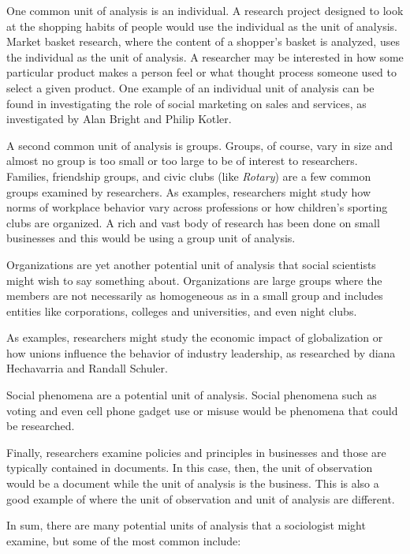 One common unit of analysis is an individual. A research project designed to look at the shopping habits of people would use the individual as the unit of analysis. Market basket research, where the content of a shopper's basket is analyzed, uses the individual as the unit of analysis. A researcher may be interested in how some particular product makes a person feel or what thought process someone used to select a given product. One example of an individual unit of analysis can be found in investigating the role of social marketing on sales and services, as investigated by Alan Bright\cite{bright2000role} and Philip Kotler\cite{kotler1989social}.

A second common unit of analysis is groups. Groups, of course, vary in size and almost no group is too small or too large to be of interest to researchers. Families, friendship groups, and civic clubs (like \textit{Rotary}) are a few common groups examined by researchers. As examples, researchers might study how norms of workplace behavior vary across professions or how children's sporting clubs are organized. A rich and vast body of research has been done on small businesses and this would be using a group unit of analysis\cite{yusuf1995critical}\cite{huck1991competencies}.

Organizations are yet another potential unit of analysis that social scientists might wish to say something about. Organizations are large groups where the members are not necessarily as homogeneous as in a small group and includes entities like corporations, colleges and universities, and even night clubs.

As examples, researchers might study the economic impact of globalization or how unions influence the behavior of industry leadership, as researched by
diana Hechavarria\cite{hechavarria2009cultural} and Randall Schuler\cite{schuler1998understanding}.

Social phenomena are a potential unit of analysis. Social phenomena such as voting and even cell phone gadget use or misuse would be phenomena that could be researched.

Finally, researchers examine policies and principles in businesses and those are typically contained in documents. In this case, then, the unit of observation would be a document while the unit of analysis is the business. This is also a good example of where the unit of observation and unit of analysis are different.

In sum, there are many potential units of analysis that a sociologist might examine, but some of the most common include:

